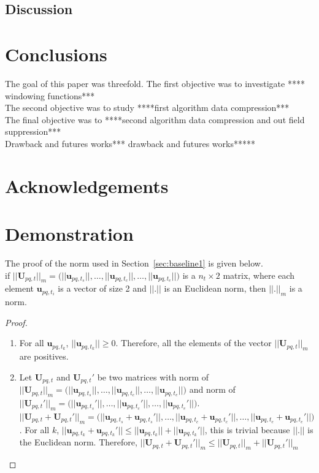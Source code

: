 \documentclass[useAMS,usenatbib]{mn2e}
\begin{document}
\subsection{Discussion}
\section{Conclusions}
The goal of this paper was threefold. The first objective was to investigate **** windowing functions***\\
The second objective  was to study ****first algorithm data compression***\\
The final objective was to ****second algorithm data compression and out field suppression*** \\
Drawback and futures works*** drawback and futures works*****

\section*{Acknowledgements}


\appendix
\section[]{Demonstration}
\label{sec:demonorm}
The proof of the norm used in Section~\ref{sec:baseline1} is given below.\\
if $||\textbf{U}_{pq,t}||_{m}=\Bigg(||\mathbf{u}_{pq,t_s}||, \dots , ||\mathbf{u}_{pq,t_c}||, \dots, ||\mathbf{u}_{pq,t_e}||\Bigg)$ is a 
$n_t\times2$ matrix, where each element $\mathbf{u}_{pq,t_i}$ is a vector of size 2 and $||.||$ is an Euclidean norm, then $||.||_{m}$ 
is a norm.
\begin{proof}
\begin{enumerate}
 \item  For all $\mathbf{u}_{pq,t_k}$, $||\mathbf{u}_{pq,t_k}||\geq 0$. Therefore, all the elements of the vector
    $||\mathbf{U}_{pq,t}||_{m}$ are positives.
 \item Let $\mathbf{U}_{pq,t}$ and $\mathbf{U}_{pq,t}'$ be two 
matrices with norm of $||\textbf{U}_{pq,t}||_{m}=\Bigg(||\mathbf{u}_{pq,t_s}||, \dots , ||\mathbf{u}_{pq,t_c}||, \dots, 
||\mathbf{u}_{pq,t_e}||\Bigg)$ and norm of $||\textbf{U}_{pq,t}'||_{m}=\Bigg(||\mathbf{u}_{pq,t_s}'||, \dots , ||\mathbf{u}_{pq,t_c}'||, 
\dots, ||\mathbf{u}_{pq,t_e}'||\Bigg)$. 
$||\mathbf{U}_{pq,t}+\mathbf{U}_{pq,t}'||_{m}=\Bigg(||\mathbf{u}_{pq,t_s}+\mathbf{u}_{pq,t_s}'||, \dots , 
||\mathbf{u}_{pq,t_c}+\mathbf{u}_{pq,t_c}'||, \dots, ||\mathbf{u}_{pq,t_e}+\mathbf{u}_{pq,t_e}'||\Bigg)$.  For all $k$, 
$||\mathbf{u}_{pq,t_k}+\mathbf{u}_{pq,t_k}'||\leq ||\mathbf{u}_{pq,t_k}||+||\mathbf{u}_{pq,t_k}'||$, this is trivial because $||.||$ is the 
Euclidean norm. Therefore,
$||\mathbf{U}_{pq,t}+\mathbf{U}_{pq,t}'||_{m} \leq ||\mathbf{U}_{pq,t}||_{m} + ||\mathbf{U}_{pq,t}'||_{m}$
\end{enumerate}
\end{proof}
\end{document}
